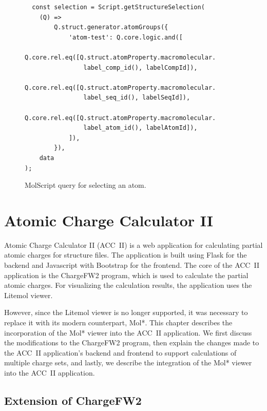 \documentclass[
  digital,     %
  oneside,     %
  nosansbold,  %
  nocolorbold, %
  lof,         %
  lot,         %
]{fithesis4}
\begin{document}
\begin{figure}[htbp]
  \begin{verbatim}
  const selection = Script.getStructureSelection(
    (Q) =>
        Q.struct.generator.atomGroups({
            'atom-test': Q.core.logic.and([
                Q.core.rel.eq([Q.struct.atomProperty.macromolecular.
                label_comp_id(), labelCompId]),
                Q.core.rel.eq([Q.struct.atomProperty.macromolecular.
                label_seq_id(), labelSeqId]),
                Q.core.rel.eq([Q.struct.atomProperty.macromolecular.
                label_atom_id(), labelAtomId]),
            ]),
        }),
    data
);
\end{verbatim}
\caption{MolScript query for selecting an atom.}
\label{fig:focus}
\end{figure}

\clearpage

\chapter{Atomic Charge Calculator II}
\label{chapter:atomic_charge_calculator_ii}

Atomic Charge Calculator II (ACC~II) is a web application for calculating partial atomic charges for structure files. The application is built using Flask for the backend and Javascript with Bootstrap for the frontend. The core of the ACC~II application is the ChargeFW2 program, which is used to calculate the partial atomic charges. For visualizing the calculation results, the application uses the Litemol viewer. \cite{racek2020acc2} 

However, since the Litemol viewer is no longer supported, it was necessary to replace it with its modern counterpart, Mol*. This chapter describes the incorporation of the Mol* viewer into the ACC~II application. We first discuss the modifications to the ChargeFW2 program, then explain the changes made to the ACC~II application's backend and frontend to support calculations of multiple charge sets, and lastly, we describe the integration of the Mol* viewer into the ACC~II application.

\section{Extension of ChargeFW2}
\label{section:chargefw2_extension}
\end{document}
